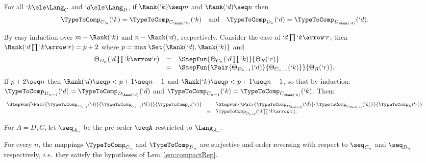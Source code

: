\documentclass{CSML}
\def\ie{\emph{i.e.}}
\begin{document}
 \begin{lem} \label{lem:rank}
For all $`k \ele \Lang_C$ and $`d \ele \Lang_D$, if $\Rank(`k) \seq m$ and $\Rank(`d) \seq n$ then
%
 \[ \begin{array}{rcl}
\TypeToComp_{C_m}(`k) = \TypeToComp_{C_{\Rank(`k)}}(`k) 
	&\textrm{and}&
\TypeToComp_{D_n}(`d) = \TypeToComp_{D_{\Rank(`d)}}(`d).
 \end{array} \]
 \end{lem}

\proof %
By easy induction over $m - \Rank(`k)$ and $n - \Rank(`d)$, respectively. 
Consider the case of $`d\prod`k\arrow `r$; then $\Rank(`d\prod`k\arrow `r) = p + 2$ where $p = \max \Set{\Rank(`d),\Rank(`k)}$ and
%
 \[ \begin{array}{rcl}
\Theta_{D_n}(`d\prod`k\arrow `r) &=& 
\StepFun{\Theta_{C_n}(`d\prod`k) }{ \Theta_R(`r)} \\ &=&
\StepFun{\Pair{\Theta_{D_{n-1}}(`d) }{ \Theta_{C_{n-1}}(`k)}}{ \Theta_R(`r)} . 
 \end{array} \]
If $p+2 \seq n$ then $\Rank(`d) \seq p < p+1 \seq n-1$ and $\Rank(`k) \seq p < p+1 \seq n-1$, so that by induction:
$\TypeToComp_{D_{n-1}}(`d) = \TypeToComp_{D_{\Rank(`d)}}(`d)$ and $\TypeToComp_{C_{n-1}}(`k) = \TypeToComp_{C_{\Rank(`k)}}(`k)$. Then:
%
 \[ \begin{array}{rcl} 
\StepFun{\Pair{\TypeToComp_{D_{n-1}}(`d) }{ \TypeToComp_{C_{n-1}}(`k)}}{ \TypeToComp_R(`r)} 
	&=& 
 \StepFun{\Pair{\TypeToComp_{D_{\Rank(`d)}}(`d) }{ \TypeToComp_{C_{\Rank(`k)}}(`k)}}{ \TypeToComp_R(`r)} \\
	&=& 
	\TypeToComp_{D_{p+2}}(`d\prod`k\arrow `r).
 \end{array} \]
\arrayqed[-22pt] 

\noindent For $A=D,C$, let $\seq_{A_n}$ be the pre-order $\seqA$ restricted to $\Lang_{A_n}$.

 \begin{lem} \label{lem:Theta_nSurRev}
For every $n$, the mappings $\TypeToComp_{C_n}$ and $ \TypeToComp_{D_n}$ are surjective and order reversing with respect to $\seq_{C_n}$ and $\seq_{D_n}$ respectively, \ie~they satisfy the hypotheses of Lem.\skp\ref{lem:compactRep}.
 \end{lem}
\end{document}
